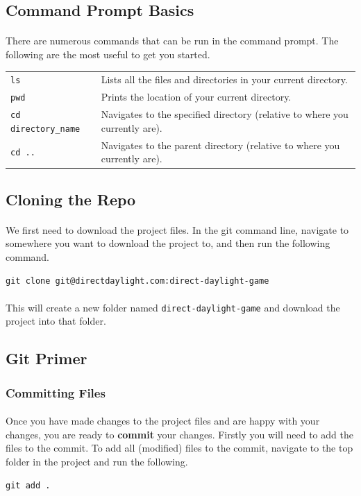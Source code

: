 \documentclass[11pt]{article}
\begin{document}
\subsection{Command Prompt Basics}
\paragraph{}
There are numerous commands that can be run in the command prompt. The following are the most useful to get you started.
\begin{center}
\begin{tabular}{ll}
\lstinline!ls! & Lists all the files and directories in your current directory.\\ 
\lstinline!pwd! & Prints the location of your current directory.\\
\lstinline!cd directory_name! & Navigates to the specified directory (relative to where you currently are).\\
\lstinline!cd .. ! & Navigates to the parent directory (relative to where you currently are).\\
\end{tabular} 
\end{center}
\subsection{Cloning the Repo}
\paragraph{}
We first need to download the project files. In the git command line, navigate to somewhere you want to download the project to, and then run the following command.
\begin{lstlisting}
git clone git@directdaylight.com:direct-daylight-game
\end{lstlisting}
\paragraph{}
This will create a new folder named \lstinline{direct-daylight-game} and download the project into that folder.
\subsection{Git Primer}
\subsubsection{Committing Files}
\paragraph{}
Once you have made changes to the project files and are happy with your changes, you are ready to \textbf{commit} your changes. Firstly you will need to add the files to the commit. To add all (modified) files to the commit, navigate to the top folder in the project and run the following.
\begin{lstlisting}
git add .
\end{lstlisting}
\end{document}
